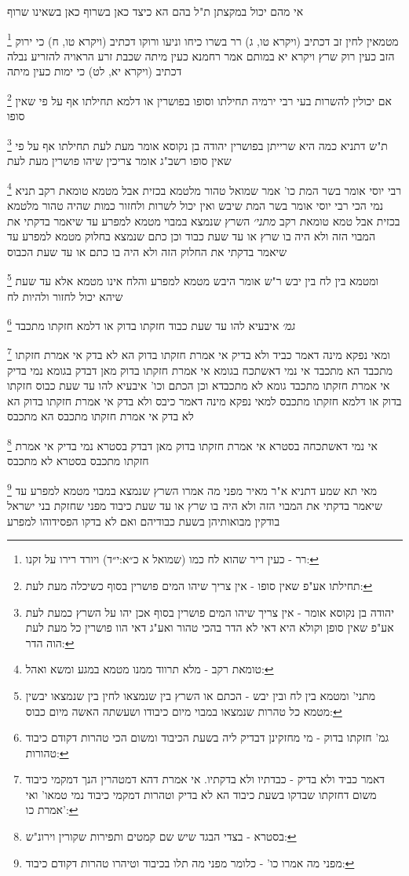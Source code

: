 \documentclass[12pt, openany]{book}
\newcommand{\footnotecomment}[1]{
	\renewcommand\thefootnote{}
	\footnote{#1}}
\newcommand{\commenta}[1]{\footnotecomment{#1}}
\begin{document}
{אי מהם יכול במקצתן ת"ל בהם הא כיצד כאן בשרוף כאן בשאינו שרוף
\commenta{רר - כעין ריר שהוא לח כמו (שמואל א כ״א:י״ד) ויורד רירו על זקנו:}
מטמאין לחין זב דכתיב (ויקרא טו, ג) רר בשרו כיחו וניעו ורוקו דכתיב (ויקרא טו, ח) כי ירוק הזב כעין רוק 
שרץ {ויקרא יא } במותם אמר רחמנא כעין מיתה שכבת זרע הראויה להזריע נבלה דכתיב (ויקרא יא, לט) כי ימות כעין מיתה
\commenta{תחילתו אע"פ שאין סופו - אין צריך שיהו המים פושרין בסוף כשיכלה מעת לעת:}
אם יכולין להשרות בעי רבי ירמיה תחילתו וסופו בפושרין או דלמא תחילתו אף על פי שאין סופו 
\commenta{יהודה בן נקוסא אומר - אין צריך שיהו המים פושרין בסוף אכן יהו על השרץ כמעת לעת אע"פ שאין סופן וקולא היא דאי לא הדר בהכי טהור ואע"ג דאי הוו פושרין כל מעת לעת הוה הדר:}
ת"ש דתניא כמה היא שרייתן בפושרין יהודה בן נקוסא אומר מעת לעת תחילתו אף על פי שאין סופו רשב"ג אומר צריכין שיהו פושרין מעת לעת
\commenta{טומאת רקב - מלא תרווד ממנו מטמא במגע ומשא ואהל:}
רבי יוסי אומר בשר המת כו' אמר שמואל טהור מלטמא בכזית אבל מטמא טומאת רקב תניא נמי הכי רבי יוסי אומר בשר המת שיבש ואין יכול לשרות ולחזור כמות שהיה טהור מלטמא בכזית אבל טמא טומאת רקב
{\large\emph{מתני׳}} השרץ שנמצא במבוי מטמא למפרע עד שיאמר בדקתי את המבוי הזה ולא היה בו שרץ או עד שעת כבוד
וכן כתם שנמצא בחלוק מטמא למפרע עד שיאמר בדקתי את החלוק הזה ולא היה בו כתם או עד שעת הכבוס 
\commenta{מתני' ומטמא בין לח ובין יבש - הכתם או השרץ בין שנמצאו לחין בין שנמצאו יבשין מטמא כל טהרות שנמצאו במבוי מיום כיבודו ושעשתה האשה מיום כבוס:}
ומטמא בין לח בין יבש ר"ש אומר היבש מטמא למפרע והלח אינו מטמא אלא עד שעת שיהא יכול לחזור ולהיות לח
\commenta{גמ' חזקתו בדוק - מי מחזקינן דבדיק ליה בשעת הכיבוד ומשום הכי טהרות דקודם כיבוד טהורות:}
{\large\emph{גמ׳}} איבעיא להו עד שעת כבוד חזקתו בדוק או דלמא חזקתו מתכבד 
\commenta{דאמר כביד ולא בדיק - כבדתיו ולא בדקתיו. אי אמרת דהא דמטהרין הנך דמקמי כיבוד משום דחזקתו שבדקו בשעת כיבוד הא לא בדיק וטהרות דמקמי כיבוד נמי טמאו' ואי אמרת כו':}
ומאי נפקא מינה דאמר כביד ולא בדיק אי אמרת חזקתו בדוק הא לא בדק אי אמרת חזקתו מתכבד הא מתכבד
אי נמי דאשתכח בגומא אי אמרת חזקתו בדוק מאן דבדק בגומא נמי בדיק אי אמרת חזקתו מתכבד גומא לא מתכבדא
וכן הכתם וכו' איבעיא להו עד שעת כבוס חזקתו בדוק או דלמא חזקתו מתכבס 
למאי נפקא מינה דאמר כיבס ולא בדק אי אמרת חזקתו בדוק הא לא בדק אי אמרת חזקתו מתכבס הא מתכבס 
\commenta{בסטרא - בצדי הבגד שיש שם קמטים ותפירות שקורין וירונ"ש:}
אי נמי דאשתכחה בסטרא אי אמרת חזקתו בדוק מאן דבדק בסטרא נמי בדיק אי אמרת חזקתו מתכבס בסטרא לא מתכבס 
\commenta{מפני מה אמרו כו' - כלומר מפני מה תלו בכיבוד וטיהרו טהרות דקודם כיבוד:}
מאי תא שמע דתניא א"ר מאיר מפני מה אמרו השרץ שנמצא במבוי מטמא למפרע עד שיאמר בדקתי את המבוי הזה ולא היה בו שרץ או עד שעת כיבוד מפני שחזקת בני ישראל בודקין מבואותיהן בשעת כבודיהם ואם לא בדקו הפסידוהו למפרע 
}
\end{document}
